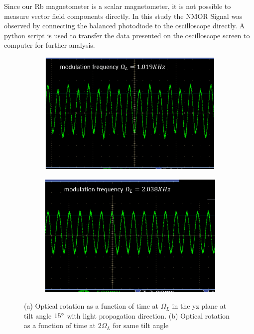 Since our Rb magnetometer is a scalar magnetometer, it is not possible to measure vector field components directly. In this study the NMOR Signal was observed by connecting the balanced photodiode to the oscilloscope directly. A python script is used to transfer the data presented on the oscilloscope screen to computer for further analysis. 

\begin{figure}
    \centering
 
    \begin{subfigure}[b]{0.45\textwidth}
        \centering
        \includegraphics[width=\textwidth]{figures/transverse_field}
        \caption{}
        \label{fig:transverse}
    \end{subfigure}
    \hfill
    \begin{subfigure}[b]{0.45\textwidth}
        \centering
        \includegraphics[width=\textwidth]{figures/transverse_field_2}
        \caption{}
        \label{fig:transverse2}
    \end{subfigure}
    \caption{(a) Optical rotation as a function of time at $\Omega_L$ in the yz plane at tilt angle $15\degree$ with light propagation direction. (b) Optical rotation as a function of time at $2\Omega_L$ for same tilt angle}
    \label{fig:Tilted field}
\end{figure}

